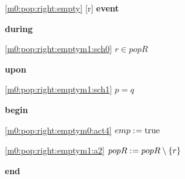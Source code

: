 \noindent \ref{m0:pop:right:empty} [r] \textbf{event}
\begin{block}
  \item   \textbf{during}
  \begin{block}
  \item[ \eqref{m0:pop:right:emptym1:sch0} ]$r \in popR $ %
  \end{block}
  \item   \textbf{upon}
  \begin{block}
  \item[ \eqref{m0:pop:right:emptym1:sch1} ]$p = q $ %
  \end{block}
  \item   \textbf{begin}
  \begin{block}
  \item[ \eqref{m0:pop:right:emptym0:act4} ]$emp \mathrel{:\mkern1mu=} \text{true} $ %
  \item[ \eqref{m0:pop:right:emptym1:a2} ]$popR \mathrel{:\mkern1mu=} popR \setminus \{ r \} $ %
  \end{block}
  \item   \textbf{end} \\
\end{block}
